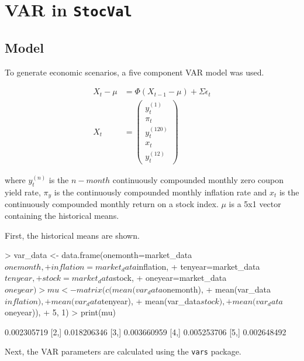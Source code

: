 \documentclass[11pt]{article}
\begin{document}
\section{VAR in \texttt{StocVal}}

\subsection{Model}
To generate economic scenarios, a five component VAR model was used. 

\begin{align*}
X_t - \mu &= \Phi (X_{t-1} - \mu) + \Sigma \epsilon_{t} \\
X_t &= \left( 
\begin{matrix}
    y_t^{(1)} \\ 
    \pi_t \\ 
	y_t^{(120)} \\ 	
	x_t \\ 
	y_t^{(12)}
\end{matrix} 
\right)
\end{align*}

where $y_t^{(n)}$ is the $n-month$ continuously compounded monthly zero coupon yield rate, $\pi_y$ is the continuously compounded monthly inflation rate and $x_t$ is the continuously compounded monthly return on a stock index. $\mu$ is a 5x1 vector containing the historical means.

First, the historical means are shown.
\begin{Schunk}
\begin{Sinput}
> var_data <- data.frame(onemonth=market_data$onemonth,
+    inflation=market_data$inflation, 
+    tenyear=market_data$tenyear,
+    stock=market_data$stock,
+    oneyear=market_data$oneyear)
> mu <- matrix(c(mean(var_data$onemonth),
+    mean(var_data$inflation),
+    mean(var_data$tenyear),
+    mean(var_data$stock),
+    mean(var_data$oneyear)),
+    5, 1)
> print(mu)
\end{Sinput}
\begin{Soutput}
            [,1]
[1,] 0.002305719
[2,] 0.018206346
[3,] 0.003660959
[4,] 0.005253706
[5,] 0.002648492
\end{Soutput}
\end{Schunk}

Next, the VAR parameters are calculated using the \texttt{vars} package.
\begin{Schunk}
\end{Schunk}
\end{document}
